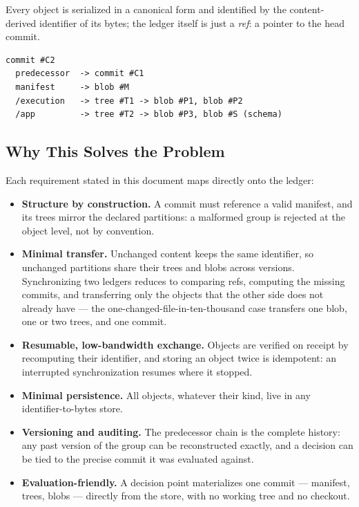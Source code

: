 \documentclass[11pt,a4paper]{article}
\newcommand{\term}[1]{\emph{#1}}                 %
\begin{document}
Every object is serialized in a canonical form and identified by the
content-derived identifier of its bytes; the ledger itself is just a
\term{ref}: a pointer to the head commit.

\begin{lstlisting}
commit #C2
  predecessor  -> commit #C1
  manifest     -> blob #M
  /execution   -> tree #T1 -> blob #P1, blob #P2
  /app         -> tree #T2 -> blob #P3, blob #S (schema)
\end{lstlisting}

\subsection{Why This Solves the Problem}

Each requirement stated in this document maps directly onto the ledger:

\begin{itemize}[nosep]
  \item \textbf{Structure by construction.} A commit must reference a
        valid manifest, and its trees mirror the declared partitions: a
        malformed group is rejected at the object level, not by
        convention.
  \item \textbf{Minimal transfer.} Unchanged content keeps the same
        identifier, so unchanged partitions share their trees and blobs
        across versions. Synchronizing two ledgers reduces to comparing
        refs, computing the missing commits, and transferring only the
        objects that the other side does not already have --- the
        one-changed-file-in-ten-thousand case transfers one blob, one or
        two trees, and one commit.
  \item \textbf{Resumable, low-bandwidth exchange.} Objects are verified
        on receipt by recomputing their identifier, and storing an object
        twice is idempotent: an interrupted synchronization resumes where
        it stopped.
  \item \textbf{Minimal persistence.} All objects, whatever their kind,
        live in any identifier-to-bytes store.
  \item \textbf{Versioning and auditing.} The predecessor chain is the
        complete history: any past version of the group can be
        reconstructed exactly, and a decision can be tied to the precise
        commit it was evaluated against.
  \item \textbf{Evaluation-friendly.} A decision point materializes one
        commit --- manifest, trees, blobs --- directly from the store,
        with no working tree and no checkout.
\end{itemize}
\end{document}
